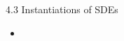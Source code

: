 \begin{frame}{4.3 Instantiations of SDEs}
    \begin{itemize}
        \item
    \end{itemize}
\end{frame}
